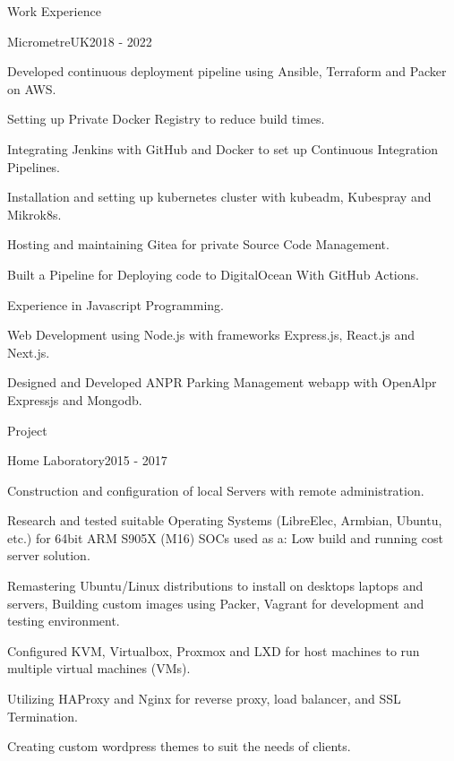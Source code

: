 \documentclass{resume}
\begin{document}
\begin{rSection}{Work Experience}
\begin{rSubsection}{MicrometreUK}{2018 - 2022}{}

\item Developed continuous deployment pipeline using Ansible, Terraform and Packer on AWS. 
\item Setting up Private Docker Registry  to reduce build times.  
\item Integrating Jenkins with GitHub and Docker to set up Continuous Integration Pipelines.
\item Installation and setting up kubernetes cluster with kubeadm, Kubespray and Mikrok8s. 
\item Hosting and maintaining Gitea for private Source Code Management.
\item Built a Pipeline for  Deploying code to DigitalOcean With GitHub Actions.
\item Experience in Javascript Programming.
\item Web Development using Node.js with frameworks Express.js, React.js and Next.js.
\item Designed and Developed ANPR Parking Management webapp with OpenAlpr Expressjs and Mongodb.
\end{rSubsection}
\end{rSection}

\begin{rSection}{Project}
\begin{rSubsection}{Home Laboratory}{2015 - 2017}{}

\item Construction and configuration of local Servers with remote administration.
\item Research and tested suitable Operating Systems (LibreElec, Armbian, Ubuntu,
etc.) for 64bit ARM S905X (M16) SOCs used as a: Low build and running cost
server solution.
\item Remastering Ubuntu/Linux distributions to install on desktops laptops and
servers, Building custom images using Packer, Vagrant for development and
testing environment.
\item Configured KVM, Virtualbox, Proxmox and LXD for host machines to run
multiple virtual machines (VMs).
\item Utilizing HAProxy and Nginx for reverse proxy, load balancer, and SSL Termination.
\item Creating custom wordpress themes to suit the needs of clients.
\end{rSubsection}
\end{rSection}
\end{document}
